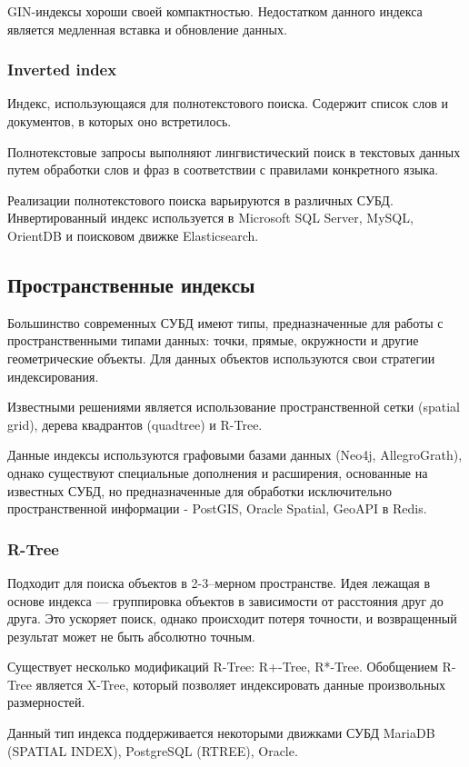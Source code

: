 GIN-индексы хороши своей компактностью. Недостатком данного индекса является медленная вставка и обновление данных.

\subsubsection{Inverted index}
Индекс, использующаяся для полнотекстового поиска. Содержит список слов и документов, в которых оно встретилось.

Полнотекстовые запросы выполняют лингвистический поиск в текстовых данных путем обработки слов и фраз в соответствии с правилами конкретного языка.

Реализации полнотекстового поиска варьируются в различных СУБД. Инвертированный индекс используется в Microsoft SQL Server, MySQL, OrientDB и поисковом движке Elasticsearch.

\subsection{Пространственные индексы}
Большинство современных СУБД имеют типы, предназначенные для работы с пространственными типами данных: точки, прямые, окружности и другие геометрические объекты. Для данных объектов используются свои стратегии индексирования.

Известными решениями является использование пространственной сетки (spatial grid), дерева квадрантов (quadtree) и R-Tree.

Данные индексы используются графовыми базами данных (Neo4j, AllegroGrath), однако существуют специальные дополнения и расширения, основанные на известных СУБД, но предназначенные для обработки исключительно пространственной информации - PostGIS, Oracle Spatial, GeoAPI в Redis.

\subsubsection{R-Tree}
Подходит для поиска объектов в 2-3--мерном пространстве. Идея лежащая в основе индекса --- группировка объектов в зависимости от расстояния друг до друга. Это ускоряет поиск, однако происходит потеря точности, и возвращенный результат может не быть абсолютно точным.

Существует несколько модификаций R-Tree: R+-Tree, R*-Tree. Обобщением R-Tree является X-Tree, который позволяет индексировать данные произвольных размерностей.

Данный тип индекса поддерживается некоторыми движками СУБД MariaDB (SPATIAL INDEX), PostgreSQL (RTREE), Oracle.

